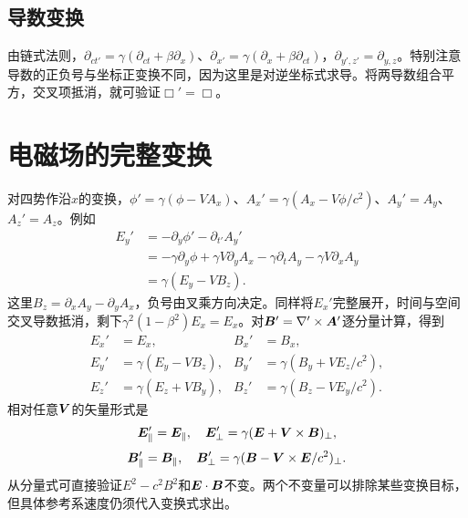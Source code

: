 \subsection{导数变换}
由链式法则，$\partial_{ct'}=\gamma(\partial_{ct}+\beta\partial_x)$、$\partial_{x'}=\gamma(\partial_x+\beta\partial_{ct})$，$\partial_{y',z'}=\partial_{y,z}$。特别注意导数的正负号与坐标正变换不同，因为这里是对逆坐标式求导。将两导数组合平方，交叉项抵消，就可验证$\Box'=\Box$。

\section{电磁场的完整变换}\label{th:m3fields}
对四势作沿$x$的变换，$\phi'=\gamma(\phi-VA_x)$、$A_x'=\gamma(A_x-V\phi/c^2)$、$A_y'=A_y$、$A_z'=A_z$。例如
\begin{align*}
 E_y'&=-\partial_y\phi'-\partial_{t'}A_y'\\
 &=-\gamma\partial_y\phi+\gamma V\partial_y A_x
 -\gamma\partial_tA_y-\gamma V\partial_xA_y\\
 &=\gamma(E_y-VB_z).
\end{align*}
这里$B_z=\partial_xA_y-\partial_yA_x$，负号由叉乘方向决定。同样将$E_x'$完整展开，时间与空间交叉导数抵消，剩下$\gamma^2(1-\beta^2)E_x=E_x$。对$\bm{B}'=\nabla'\times\bm{A}'$逐分量计算，得到
\begin{equation}\label{eq:m3field}
 \begin{aligned}
 E_x'&=E_x,&B_x'&=B_x,\\
 E_y'&=\gamma(E_y-VB_z),&B_y'&=\gamma(B_y+VE_z/c^2),\\
 E_z'&=\gamma(E_z+VB_y),&B_z'&=\gamma(B_z-VE_y/c^2).
 \end{aligned}
\end{equation}
相对任意$\bm{V}$的矢量形式是
\[
 \bm{E}'_\parallel=\bm{E}_\parallel,\quad
 \bm{E}'_\perp=\gamma(\bm{E}+\bm{V}\times\bm{B})_\perp,
\]
\[
 \bm{B}'_\parallel=\bm{B}_\parallel,\quad
 \bm{B}'_\perp=\gamma(\bm{B}-\bm{V}\times\bm{E}/c^2)_\perp.
\]
从分量式可直接验证$E^2-c^2B^2$和$\bm{E}\cdot\bm{B}$不变。两个不变量可以排除某些变换目标，但具体参考系速度仍须代入变换式求出。

